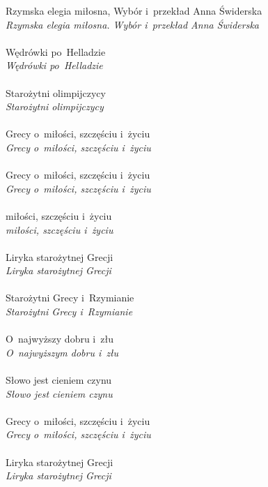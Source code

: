 \documentclass[a4paper,11pt]{article}
\begin{document}
\Jest  Rzymska elegia miłosna, Wybór i~przekład Anna Świderska \\
\Powin \textit{Rzymska elegia miłosna. Wybór i~przekład Anna Świderska} \\
 \\
\Jest  Wędrówki po~Helladzie \\
\Powin \textit{Wędrówki po~Helladzie} \\
 \\
\Jest  Starożytni olimpijczycy \\
\Powin \textit{Starożytni olimpijczycy} \\
 \\
\Jest  Grecy o~miłości, szczęściu i~życiu \\
\Powin \textit{Grecy o~miłości, szczęściu i~życiu} \\
 \\
\Jest  Grecy o~miłości, szczęściu i~życiu \\
\Powin \textit{Grecy o~miłości, szczęściu i~życiu} \\
 \\
\Jest  miłości, szczęściu i~życiu \\
\Powin \textit{miłości, szczęściu i~życiu} \\
 \\
\Jest  Liryka starożytnej Grecji \\
\Powin \textit{Liryka starożytnej Grecji} \\
 \\
\Jest  Starożytni Grecy i~Rzymianie \\
\Powin \textit{Starożytni Grecy i~Rzymianie} \\
 \\
\Jest  O~najwyższy dobru i~złu \\
\Powin \textit{O~najwyższym dobru i~złu} \\
 \\
\Jest  Słowo jest cieniem czynu \\
\Powin \textit{Słowo jest cieniem czynu} \\
 \\
\Jest  Grecy o~miłości, szczęściu i~życiu \\
\Powin \textit{Grecy o~miłości, szczęściu i~życiu} \\
 \\
\Jest  Liryka starożytnej Grecji \\
\Powin \textit{Liryka starożytnej Grecji} \\
\end{document}
